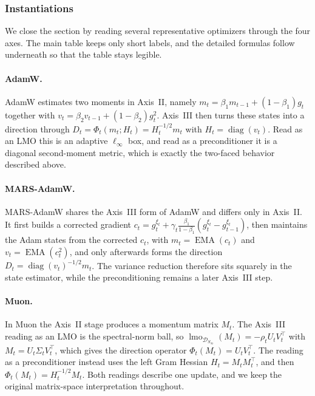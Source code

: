 \subsubsection{Instantiations}
\label{sec:four-axis-instantiation}

We close the section by reading several representative optimizers through the four axes. The main table keeps only short labels, and the detailed formulas follow underneath so that the table stays legible.




\paragraph{AdamW.}
AdamW estimates two moments in Axis~II, namely $m_t=\beta_1 m_{t-1}+(1-\beta_1)g_t$ together with $v_t=\beta_2 v_{t-1}+(1-\beta_2)g_t^2$. Axis~III then turns these states into a direction through $D_t=\Phi_t(m_t;H_t)=H_t^{-1/2}m_t$ with $H_t=\operatorname{diag}(v_t)$. Read as an LMO this is an adaptive $\ell_\infty$ box, and read as a preconditioner it is a diagonal second-moment metric, which is exactly the two-faced behavior described above.

\paragraph{MARS-AdamW.}
MARS-AdamW shares the Axis~III form of AdamW and differs only in Axis~II. It first builds a corrected gradient $c_t=g_t^{\xi_t}+\gamma_t\frac{\beta_1}{1-\beta_1}(g_t^{\xi_t}-g_{t-1}^{\xi_t})$, then maintains the Adam states from the corrected $c_t$, with $m_t=\operatorname{EMA}(c_t)$ and $v_t=\operatorname{EMA}(c_t^2)$, and only afterwards forms the direction $D_t=\operatorname{diag}(v_t)^{-1/2}m_t$. The variance reduction therefore sits squarely in the state estimator, while the preconditioning remains a later Axis~III step.

\paragraph{Muon.}
In Muon the Axis~II stage produces a momentum matrix $M_t$. The Axis~III reading as an LMO is the spectral-norm ball, so $\operatorname{lmo}_{\mathcal{D}_{S_\infty}}(M_t)=-\rho_t U_t V_t^\top$ with $M_t=U_t\Sigma_t V_t^\top$, which gives the direction operator $\Phi_t(M_t)=U_t V_t^\top$. The reading as a preconditioner instead uses the left Gram Hessian $H_t=M_t M_t^\top$, and then $\Phi_t(M_t)=H_t^{-1/2}M_t$. Both readings describe one update, and we keep the original matrix-space interpretation throughout.

